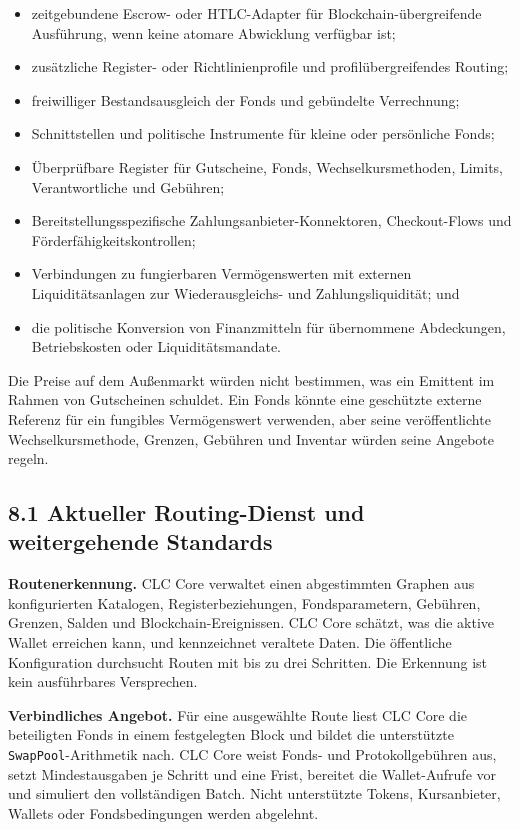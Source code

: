 \documentclass[11pt]{article}
\begin{document}
\begin{itemize}[leftmargin=*]
\item zeitgebundene Escrow- oder HTLC-Adapter für Blockchain-übergreifende Ausführung, wenn keine atomare Abwicklung verfügbar ist;
\item zusätzliche Register- oder Richtlinienprofile und profilübergreifendes Routing;
\item freiwilliger Bestandsausgleich der Fonds und gebündelte Verrechnung;
\item Schnittstellen und politische Instrumente für kleine oder persönliche Fonds;
\item Überprüfbare Register für Gutscheine, Fonds, Wechselkursmethoden, Limits, Verantwortliche und Gebühren;
\item Bereitstellungsspezifische Zahlungsanbieter-Konnektoren, Checkout-Flows und Förderfähigkeitskontrollen;
\item Verbindungen zu fungierbaren Vermögenswerten mit externen Liquiditätsanlagen zur Wiederausgleichs- und Zahlungsliquidität; und
\item die politische Konversion von Finanzmitteln für übernommene Abdeckungen, Betriebskosten oder Liquiditätsmandate.
\end{itemize}
Die Preise auf dem Außenmarkt würden nicht bestimmen, was ein Emittent im Rahmen von Gutscheinen schuldet. Ein Fonds könnte eine geschützte externe Referenz für ein fungibles Vermögenswert verwenden, aber seine veröffentlichte Wechselkursmethode, Grenzen, Gebühren und Inventar würden seine Angebote regeln.

\subsection*{8.1 Aktueller Routing-Dienst und weitergehende Standards}

\textbf{Routenerkennung.} CLC Core verwaltet einen abgestimmten Graphen aus konfigurierten Katalogen, Registerbeziehungen, Fondsparametern, Gebühren, Grenzen, Salden und Blockchain-Ereignissen. CLC Core schätzt, was die aktive Wallet erreichen kann, und kennzeichnet veraltete Daten. Die öffentliche Konfiguration durchsucht Routen mit bis zu drei Schritten. Die Erkennung ist kein ausführbares Versprechen.

\textbf{Verbindliches Angebot.} Für eine ausgewählte Route liest CLC Core die beteiligten Fonds in einem festgelegten Block und bildet die unterstützte \texttt{SwapPool}-Arithmetik nach. CLC Core weist Fonds- und Protokollgebühren aus, setzt Mindestausgaben je Schritt und eine Frist, bereitet die Wallet-Aufrufe vor und simuliert den vollständigen Batch. Nicht unterstützte Tokens, Kursanbieter, Wallets oder Fondsbedingungen werden abgelehnt.
\end{document}
